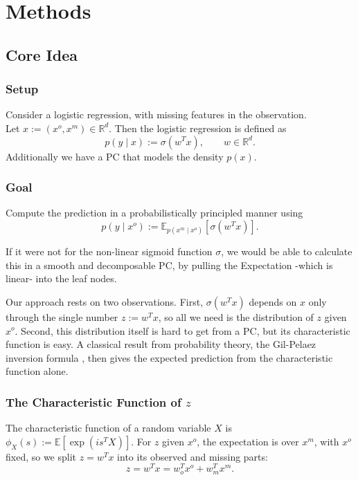 \chapter{Methods}
\label{cha:methods}

\section{Core Idea}

\newcommand{\R}{\mathbb{R}}
\newcommand{\E}{\mathbb{E}}
\newcommand{\xo}{x^o}
\newcommand{\xm}{x^m}

\subsection{Setup} Consider a logistic regression, with missing features in the observation.\\
Let $x := (\xo, \xm) \in \R^{d}$. Then the logistic regression is defined as
\[
  p(y \mid x) := \sigma (w^T x), \qquad w \in \R^{d}.
\]
Additionally we have a PC that models the density $p(x)$.

\subsection{Goal} Compute the prediction in a probabilistically principled manner using
\[
  p(y \mid \xo) := \E_{p(\xm \mid \xo)} \left[\sigma \left( w^T x \right) \right].
\]

If it were not for the non-linear sigmoid function $\sigma$, we would be able to calculate this in a smooth
and decomposable PC, by pulling the Expectation -which is linear- into the leaf nodes.

Our approach rests on two observations. First, $\sigma(w^T x)$ depends on $x$ only through the single
number $z := w^T x$, so all we need is the distribution of $z$ given $\xo$. Second, this distribution
itself is hard to get from a PC, but its characteristic function is easy. A classical result from
probability theory, the Gil-Pelaez inversion formula \cite{gilpelaez1951}, then gives the expected prediction from the
characteristic function alone.

\subsection{The Characteristic Function of $z$}
\label{subsec:cf-z}

The characteristic function of a random variable $X$ is
$\phi_X(s) := \E \left[ \exp(i s^T X) \right]$.
For $z$ given $\xo$, the expectation is over $\xm$, with $\xo$ fixed, so we split $z = w^T x$ into its observed and missing parts:
\[
  z = w^T x = w_o^T \xo + w_m^T \xm.
\]

